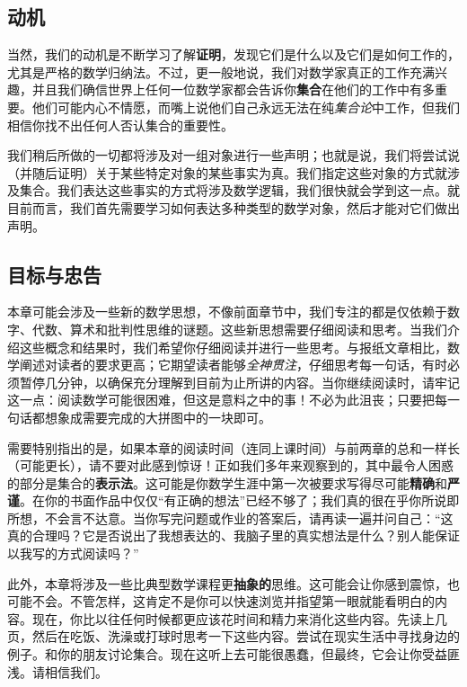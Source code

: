 \subsection{动机}

当然，我们的动机是不断学习了解\textbf{证明}，发现它们是什么以及它们是如何工作的，尤其是严格的数学归纳法。不过，更一般地说，我们对数学家真正的工作充满兴趣，并且我们确信世界上任何一位数学家都会告诉你\textbf{集合}在他们的工作中有多重要。他们可能内心不情愿，而嘴上说他们自己永远无法在纯\textit{集合论}中工作，但我们相信你找不出任何人否认集合的重要性。

我们稍后所做的一切都将涉及对一组对象进行一些声明；也就是说，我们将尝试说（并随后证明）关于某些特定对象的某些事实为真。我们指定这些对象的方式就涉及集合。我们表达这些事实的方式将涉及数学逻辑，我们很快就会学到这一点。就目前而言，我们首先需要学习如何表达多种类型的数学对象，然后才能对它们做出声明。

\subsection{目标与忠告}

本章可能会涉及一些新的数学思想，不像前面章节中，我们专注的都是仅依赖于数字、代数、算术和批判性思维的谜题。这些新思想需要仔细阅读和思考。当我们介绍这些概念和结果时，我们希望你仔细阅读并进行一些思考。与报纸文章相比，数学阐述对读者的要求更高；它期望读者能够\textit{全神贯注}，仔细思考每一句话，有时必须暂停几分钟，以确保充分理解到目前为止所讲的内容。当你继续阅读时，请牢记这一点：阅读数学可能很困难，但这是意料之中的事！不必为此沮丧；只要把每一句话都想象成需要完成的大拼图中的一块即可。

需要特别指出的是，如果本章的阅读时间（连同上课时间）与前两章的总和一样长（可能更长），请不要对此感到惊讶！正如我们多年来观察到的，其中最令人困惑的部分是集合的\textbf{表示法}。这可能是你数学生涯中第一次被要求写得尽可能\textbf{精确}和\textbf{严谨}。在你的书面作品中仅仅``有正确的想法''已经不够了；我们真的很在乎你所说即所想，不会言不达意。当你写完问题或作业的答案后，请再读一遍并问自己：``这真的合理吗？它是否说出了我想表达的、我脑子里的真实想法是什么？别人能保证以我写的方式阅读吗？''

此外，本章将涉及一些比典型数学课程更\textbf{抽象的}思维。这可能会让你感到震惊，也可能不会。不管怎样，这肯定不是你可以快速浏览并指望第一眼就能看明白的内容。现在，你比以往任何时候都更应该花时间和精力来消化这些内容。先读上几页，然后在吃饭、洗澡或打球时思考一下这些内容。尝试在现实生活中寻找身边的例子。和你的朋友讨论集合。现在这听上去可能很愚蠢，但最终，它会让你受益匪浅。请相信我们。